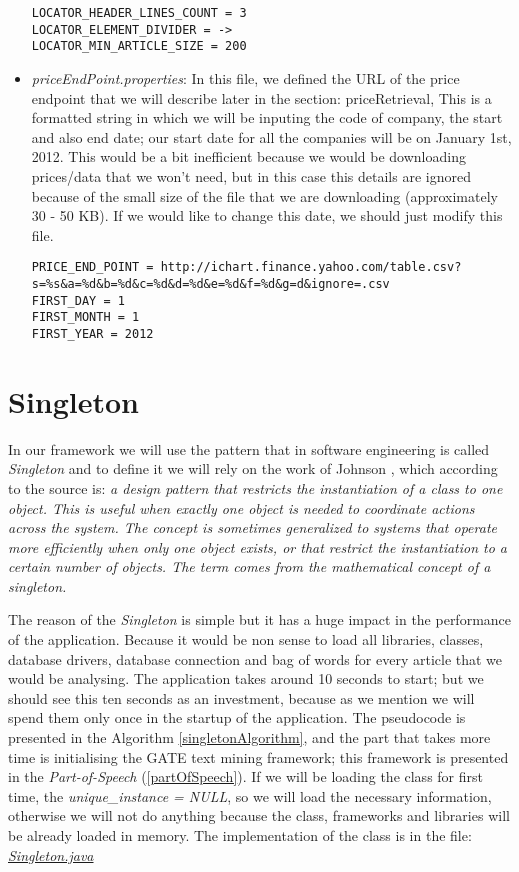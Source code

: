 \begin{itemize}
\begin{lstlisting}
LOCATOR_HEADER_LINES_COUNT = 3
LOCATOR_ELEMENT_DIVIDER = ->
LOCATOR_MIN_ARTICLE_SIZE = 200
\end{lstlisting}
	
	\item \emph{priceEndPoint.properties}: In this file, we defined the URL of the price endpoint that we will describe later in the section: {priceRetrieval}, This is a formatted string in which we will be inputing the code of company, the start and also end date; our start date for all the companies will be on January 1st, 2012. This would be a bit inefficient because we would be downloading prices/data that we won't need, but in this case this details are ignored because of the small size of the file that we are downloading (approximately 30 - 50 KB). If we would like to change this date, we should just modify this file.

\begin{lstlisting}
PRICE_END_POINT = http://ichart.finance.yahoo.com/table.csv? s=%s&a=%d&b=%d&c=%d&d=%d&e=%d&f=%d&g=d&ignore=.csv
FIRST_DAY = 1
FIRST_MONTH = 1
FIRST_YEAR = 2012
\end{lstlisting}
	
\end{itemize}

\section{Singleton}

In our framework we will use the pattern that in software engineering is called \emph{Singleton} and to define it we will rely on the work of  Johnson \cite{S2014}, which according to the source is: \emph{a design pattern that restricts the instantiation of a class to one object. This is useful when exactly one object is needed to coordinate actions across the system. The concept is sometimes generalized to systems that operate more efficiently when only one object exists, or that restrict the instantiation to a certain number of objects. The term comes from the mathematical concept of a singleton.}

The reason of the \emph{Singleton} is simple but it has a huge impact in the performance of the application. Because it would be non sense to load all libraries, classes, database drivers, database connection and bag of words for every article that we would be analysing. The application takes around 10 seconds to start; but we should see this ten seconds as an investment, because as we mention we will spend them only once in the startup of the application. The pseudocode is presented in the Algorithm \ref{singletonAlgorithm}, and the part that takes more time is initialising the GATE text mining framework; this framework is presented in the \emph{Part-of-Speech} (\ref{partOfSpeech}). If we will be loading the class for first time, the \emph{unique\_instance = NULL}, so we will load the necessary information, otherwise we will not do anything because the class, frameworks and libraries will be already loaded in memory. The implementation of the class is in the file: \emph{\ul{Singleton.java}}

